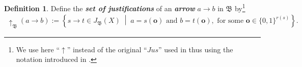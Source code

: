 \documentclass[11pt]{amsart}
\theoremstyle{definition} %
\newtheorem{definition}[theorem]{Definition}
\begin{document}
\begin{definition} Define the \textit{\textbf{set of justifications}} of an \textit{\textbf{arrow}} $a\to b$ in $\mathfrak B$ by\footnote{We use here ``$\uparrow$'' instead of the original ``$Jus$'' used in  thus using the notation introduced in .}
\begin{align*} 
	\uparrow_\mathfrak B(a\to b):=\left\{s\to t\in J_\mathfrak B(X) \;\middle|\; a= s(\mathbf o)\text{ and }b= t(\mathbf o),\text{ for some }\mathbf o\in\{0,1\}^{r(s)}\right\}.
\end{align*}
\end{definition}

\end{document}
